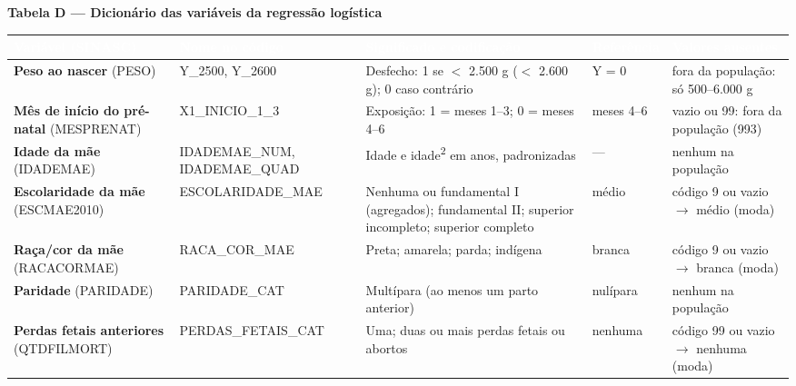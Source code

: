 \documentclass[10pt,a4paper]{article}
\newcommand{\seta}{\ensuremath{\rightarrow}}
\newcommand{\menor}{\ensuremath{<}}
\begin{document}
\par\vspace{4pt}
{\footnotesize\bfseries\color{iptescuro} Tabela D --- Dicionário das variáveis da regressão logística\par}\vspace{2pt}
{\footnotesize\renewcommand{\arraystretch}{1.2}\setlength{\tabcolsep}{4pt}
\begin{tabular}{>{\raggedright\arraybackslash}p{} >{\raggedright\arraybackslash}p{} >{\raggedright\arraybackslash}p{} >{\raggedright\arraybackslash}p{} >{\raggedright\arraybackslash}p{}}
\rowcolor{iptazul}\textcolor{white}{\bfseries Variável (SINASC)} & \textcolor{white}{\bfseries Nome no código} & \textcolor{white}{\bfseries Significado e codificação} & \textcolor{white}{\bfseries Referência} & \textcolor{white}{\bfseries Valores ausentes} \\ \hline
\textbf{Peso ao nascer} (PESO) & Y\_2500, Y\_2600 & Desfecho: 1 se \menor{} 2.500 g (\menor{} 2.600 g); 0 caso contrário & Y = 0 & fora da população: só 500--6.000 g \\ \hline
\textbf{Mês de início do pré-natal} (MESPRENAT) & X1\_INICIO\_1\_3 & Exposição: 1 = meses 1--3; 0 = meses 4--6 & meses 4--6 & vazio ou 99: fora da população (993) \\ \hline
\textbf{Idade da mãe} (IDADEMAE) & IDADEMAE\_NUM, IDADEMAE\_QUAD & Idade e idade\textsuperscript{2} em anos, padronizadas & --- & nenhum na população \\ \hline
\textbf{Escolaridade da mãe} (ESCMAE2010) & ESCOLARIDADE\_MAE & Nenhuma ou fundamental I (agregados); fundamental II; superior incompleto; superior completo & médio & código 9 ou vazio \seta{} médio (moda) \\ \hline
\textbf{Raça/cor da mãe} (RACACORMAE) & RACA\_COR\_MAE & Preta; amarela; parda; indígena & branca & código 9 ou vazio \seta{} branca (moda) \\ \hline
\textbf{Paridade} (PARIDADE) & PARIDADE\_CAT & Multípara (ao menos um parto anterior) & nulípara & nenhum na população \\ \hline
\textbf{Perdas fetais anteriores} (QTDFILMORT) & PERDAS\_FETAIS\_CAT & Uma; duas ou mais perdas fetais ou abortos & nenhuma & código 99 ou vazio \seta{} nenhuma (moda) \\ \hline
\end{tabular}\par}\par{}\par\vspace{6pt}
\end{document}

